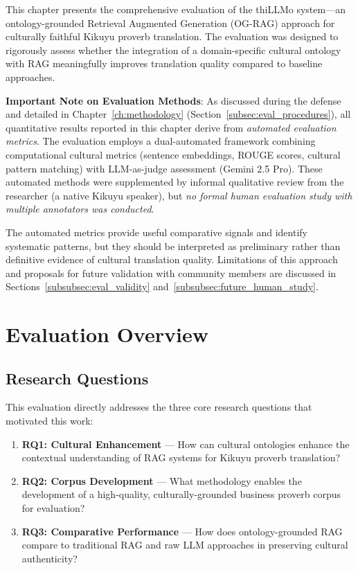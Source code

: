 \label{ch:evaluation}

This chapter presents the comprehensive evaluation of the thiLLMo system---an ontology-grounded Retrieval Augmented Generation (OG-RAG) approach for culturally faithful Kikuyu proverb translation. The evaluation was designed to rigorously assess whether the integration of a domain-specific cultural ontology with RAG meaningfully improves translation quality compared to baseline approaches. 

\textbf{Important Note on Evaluation Methods}: As discussed during the defense and detailed in Chapter~\ref{ch:methodology} (Section~\ref{subsec:eval_procedures}), all quantitative results reported in this chapter derive from \emph{automated evaluation metrics}. The evaluation employs a dual-automated framework combining computational cultural metrics (sentence embeddings, ROUGE scores, cultural pattern matching) with LLM-as-judge assessment (Gemini 2.5 Pro). These automated methods were supplemented by informal qualitative review from the researcher (a native Kikuyu speaker), but \emph{no formal human evaluation study with multiple annotators was conducted}.

The automated metrics provide useful comparative signals and identify systematic patterns, but they should be interpreted as preliminary rather than definitive evidence of cultural translation quality. Limitations of this approach and proposals for future validation with community members are discussed in Sections~\ref{subsubsec:eval_validity} and~\ref{subsubsec:future_human_study}.

\section{Evaluation Overview}
\label{sec:evaluation_overview}

\subsection{Research Questions}

This evaluation directly addresses the three core research questions that motivated this work:

\begin{enumerate}
    \item \textbf{RQ1: Cultural Enhancement} --- How can cultural ontologies enhance the contextual understanding of RAG systems for Kikuyu proverb translation?
    \item \textbf{RQ2: Corpus Development} --- What methodology enables the development of a high-quality, culturally-grounded business proverb corpus for evaluation?
    \item \textbf{RQ3: Comparative Performance} --- How does ontology-grounded RAG compare to traditional RAG and raw LLM approaches in preserving cultural authenticity?
\end{enumerate}

